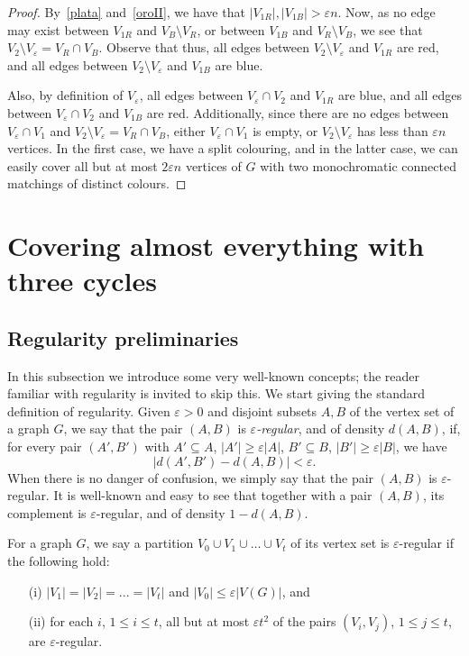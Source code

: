 \documentclass[a4paper,10pt]{article}
\let\eps\varepsilon
\begin{document}
\begin{proof}
  By~\eqref{plata} and~\eqref{oroII}, we have that   $|V_{1R}|, |V_{1B}|> \eps n$. Now,  as  no edge may exist between $V_{1R}$ and $V_B\setminus V_R$, or between $V_{1B}$ and $V_R\setminus V_B$, we see that $V_2\setminus V_\eps = V_R\cap V_B$. Observe that thus, all edges between $V_2\setminus V_\eps$ and $V_{1R}$ are red, and all edges between $V_2\setminus V_\eps$ and $V_{1B}$ are blue.  
 
Also, by definition of $V_\eps$, all edges between $V_\eps\cap V_2$ and $V_{1R}$ are blue, and all edges between $V_\eps\cap V_2$ and $V_{1B}$ are red. Additionally, since there are no edges between $V_\eps\cap V_1$ and $V_2\setminus V_\eps = V_R\cap V_B$, either $V_\eps\cap V_1$ is empty, or $V_2\setminus V_\eps$ has less than $\eps n$ vertices. In the first case, we have a split colouring, and in the latter case, we can easily cover all but at most $2\eps n$ vertices of $G$ with two monochromatic connected matchings of distinct colours.
\end{proof}

\section{Covering almost everything with three cycles}\label{sec:cycles}

\subsection{Regularity preliminaries}
 
 In this subsection we introduce some very well-known concepts; the reader familiar with regularity is invited to skip this.
We start giving the standard definition of regularity.
Given ${\varepsilon}>0$ and disjoint subsets $A, B$ of the vertex set of a graph $G$, we say that the pair $(A, B)$ is ${\varepsilon}$\textit{-regular}, and of density $d(A,B)$,  if, for every pair $(A', B')$ with $A'\subseteq A$, $|A'|\geq {\varepsilon} |A|$, $B' \subseteq B$, $|B'|\geq {\varepsilon} |B|$, we have
$$ 
 \left| d(A',B')-d(A,B)\right| <{\varepsilon}.
$$
When there is no danger of confusion, we simply say that the pair $(A,B)$ is $\eps$-regular.
It is well-known and easy to see that together with a pair $(A,B)$, its complement is $\eps$-regular, and of density $1-d(A,B)$.

For a graph $G$, we say a partition $V_0\cup V_1\cup\dots\cup V_t$ of its vertex set is ${\varepsilon}$-regular if the following hold:
\begin{itemize}
 
 \item [(i)]$|V_1|=|V_2|=...=|V_t|$ and $|V_0|\leq {\varepsilon} |V(G)|$, and
 \item [(ii)] for each $i$, $1\leq i\leq t$, all but at most ${\varepsilon} t^2$ of the pairs $(V_i, V_j)$, $1\leq j\leq t$, are  ${\varepsilon}$-regular. 
\end{itemize}
\end{document}

